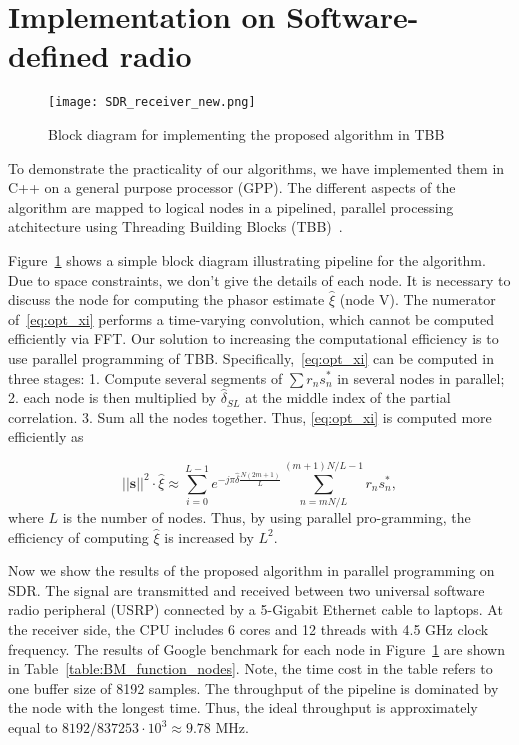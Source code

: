 \section{Implementation on Software-defined radio}
\label{sec:implementation_on_SDR}

\begin{figure}[t]
    \centerline{\texttt{[image: SDR\_receiver\_new.png]}}
    \caption{Block diagram for implementing the proposed algorithm in TBB}
    \label{fig:SDR_receiver}
    \end{figure}

To demonstrate the practicality of our algorithms, we have implemented them in C++ on a general
purpose processor (GPP). The different aspects of the algorithm are mapped to logical nodes in a pipelined, parallel processing atchitecture
using Threading Building Blocks (TBB)~\cite{Michael_19}.

Figure~\ref{fig:SDR_receiver} shows a simple block diagram illustrating pipeline for the algorithm.
Due to space constraints, we don't give the details of each node.
It is necessary to discuss the node for computing the phasor estimate $\hat{\xi}$ (node V). 
The numerator of~\eqref{eq:opt_xi} performs a time-varying convolution, which cannot be computed efficiently via FFT.
Our solution to increasing the computational efficiency is to use parallel programming 
of TBB. Specifically,~\eqref{eq:opt_xi} can be computed in three stages:
1. Compute several segments of $\sum r_ns_n^*$ in several nodes in parallel;
2. each node is then multiplied by $\hat{\delta}_{SL}$ at the middle index of the 
partial correlation.
3. Sum all the nodes together.
Thus, \eqref{eq:opt_xi} is computed more efficiently as

\begin{equation}
    \label{eq:refined_opt_S}
    ||\bm{s}||^2\cdot\hat{\xi} \approx \sum_{i=0}^{L-1} e^{-j\pi \hat{\delta}\frac{N(2m+1)}{L}}
    \sum_{n=mN/L}^{(m+1)N/L-1}r_ns_n^*,
  \end{equation}
where $L$ is the number of nodes. Thus, by using parallel pro-gramming,
the efficiency of computing $\hat{\xi}$ is increased by $L^2$.

Now we show the results of the proposed algorithm in parallel programming on SDR.
The signal are transmitted and received between two universal software radio peripheral (USRP)
connected by a 5-Gigabit Ethernet cable to laptops. At the receiver side, 
the CPU includes 6 cores and 12 threads with 4.5 GHz clock frequency. The results of 
Google benchmark for each node in Figure~\ref{fig:SDR_receiver}
are shown in Table~\ref{table:BM_function_nodes}. Note, the time cost in the table
refers to one buffer size of 8192 samples. The throughput of the 
pipeline is dominated by the node with the longest time. Thus, the ideal throughput is approximately equal to
$8192/837253 \cdot 10^3 \approx 9.78$ MHz.

